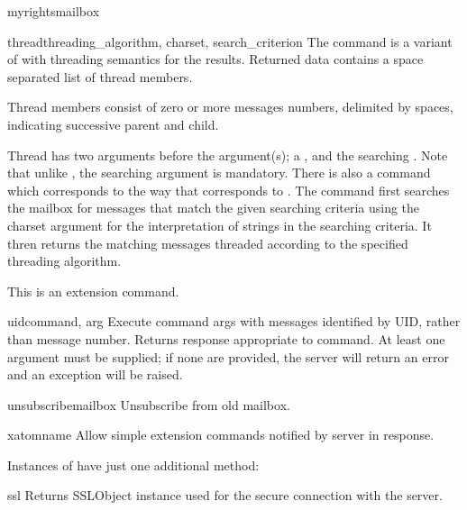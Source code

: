 \begin{methoddes}{myrights}{mailbox}
\begin{methoddesc}{thread}{threading_algorithm, charset, search_criterion}
  The  command is a variant of  with threading semantics for
  the results.  Returned data contains a space
  separated list of thread members.

  Thread members consist of zero or more messages numbers, delimited by spaces,
  indicating successive parent and child.

  Thread has two arguments before the 
  argument(s); a , and the searching .
  Note that unlike , the searching  argument is mandatory.
  There is also a  command which corresponds to  the way
  that  corresponds to .
  The  command first searches the mailbox for messages that
  match the given searching criteria using the charset argument for
  the interpretation of strings in the searching criteria. It thren
  returns the matching messages threaded according to the specified
  threading algorithm.

  This is an  extension command. 
\end{methoddesc}

\begin{methoddesc}{uid}{command, arg}
  Execute command args with messages identified by UID, rather than
  message number.  Returns response appropriate to command.  At least
  one argument must be supplied; if none are provided, the server will
  return an error and an exception will be raised.
\end{methoddesc}

\begin{methoddesc}{unsubscribe}{mailbox}
  Unsubscribe from old mailbox.
\end{methoddesc}

\begin{methoddesc}{xatom}{name}
  Allow simple extension commands notified by server in
   response.
\end{methoddesc}


Instances of  have just one additional method:

\begin{methoddesc}{ssl}{}
  Returns SSLObject instance used for the secure connection with the server.
\end{methoddesc}



\end{methoddes}
